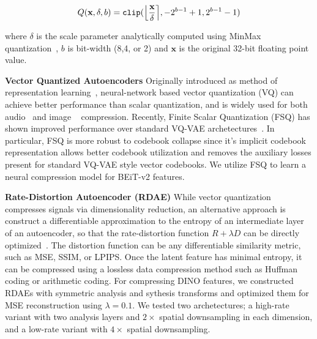 \documentclass[10pt,twocolumn,letterpaper]{article}
\begin{document}
\begin{equation}
  Q(\textbf{x}, \delta, b) = \texttt{clip}(\Big{\lfloor} \frac{\textbf{x}}{\delta} \Big{\rceil}, -2^{b-1}+1, 2^{b-1}-1)
  \label{eq:quant}
\end{equation}

where $\delta$ is the scale parameter analytically computed using MinMax quantization~\cite{jacob2018quantization}, $b$ is bit-width (8,4, or 2) and $\textbf{x}$ is the original 32-bit floating point value.

\textbf{Vector Quantized Autoencoders} Originally introduced as method of representation learning~\cite{van2017neural}, neural-network based vector quantization (VQ) can achieve better performance than scalar quantization, and is widely used for both audio~\cite{defossez2022high} and image ~\cite{Duan_2023, el-nouby2023image} compression. Recently, Finite Scalar Quantization (FSQ)  has shown improved performance over standard VQ-VAE archetectures~\cite{mentzer2023finite}. In particular, FSQ is more robust to codebook collapse since it's implicit codebook representation allows better codebook utilization and removes the auxiliary losses present for standard VQ-VAE style vector codebooks. We utilize FSQ to learn a neural compression model for BEiT-v2 features.

\textbf{Rate-Distortion Autoencoder (RDAE)} While vector quantization compresses signals via dimensionality reduction, an alternative approach is construct a differentiable approximation to the entropy of an intermediate layer of an autoencoder, so that the rate-distortion function $R+\lambda D$ can be directly optimized~\cite{balle2017end}. The distortion function can be any differentiable similarity metric, such as MSE, SSIM, or LPIPS.  Once the latent feature has minimal entropy, it can be compressed using a lossless data compression method such as Huffman coding or arithmetic coding. For compressing DINO features, we constructed RDAEs with symmetric analysis and sythesis transforms and optimized them for MSE reconstruction using $\lambda=0.1$. We tested two archetectures; a high-rate variant with two analysis layers and $2\times$ spatial downsampling in each dimension, and a low-rate variant with $4\times$ spatial downsampling.
\end{document}
